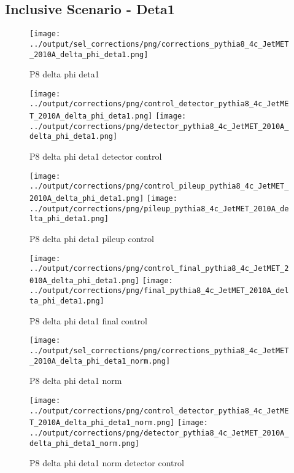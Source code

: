 \documentclass[11pt]{book}
\begin{document}
\clearpage
\subsection{Inclusive Scenario - Deta1}

\begin{figure}[ht]
\centering
\texttt{[image: ../output/sel\_corrections/png/corrections\_pythia8\_4c\_JetMET\_2010A\_delta\_phi\_deta1.png]}
\caption{P8 delta phi deta1}
\label{fig:p8_JetMET_2010A_delta_phi_deta1}
\end{figure}


\begin{figure}[ht]
\centering
\texttt{[image: ../output/corrections/png/control\_detector\_pythia8\_4c\_JetMET\_2010A\_delta\_phi\_deta1.png]}
\texttt{[image: ../output/corrections/png/detector\_pythia8\_4c\_JetMET\_2010A\_delta\_phi\_deta1.png]}
\caption{P8 delta phi deta1 detector control}
\label{fig:p8_JetMET_2010A_delta_phi_deta1_detector_control}
\end{figure}

\begin{figure}[ht]
\centering
\texttt{[image: ../output/corrections/png/control\_pileup\_pythia8\_4c\_JetMET\_2010A\_delta\_phi\_deta1.png]}
\texttt{[image: ../output/corrections/png/pileup\_pythia8\_4c\_JetMET\_2010A\_delta\_phi\_deta1.png]}
\caption{P8 delta phi deta1 pileup control}
\label{fig:p8_JetMET_2010A_delta_phi_deta1_pileup_control}
\end{figure}


\begin{figure}[ht]
\centering
\texttt{[image: ../output/corrections/png/control\_final\_pythia8\_4c\_JetMET\_2010A\_delta\_phi\_deta1.png]}
\texttt{[image: ../output/corrections/png/final\_pythia8\_4c\_JetMET\_2010A\_delta\_phi\_deta1.png]}
\caption{P8 delta phi deta1 final control}
\label{fig:p8_JetMET_2010A_delta_phi_deta1_final_control}
\end{figure}


\begin{figure}[ht]
\centering
\texttt{[image: ../output/sel\_corrections/png/corrections\_pythia8\_4c\_JetMET\_2010A\_delta\_phi\_deta1\_norm.png]}
\caption{P8 delta phi deta1 norm}
\label{fig:p8_JetMET_2010A_delta_phi_deta1_norm}
\end{figure}

\begin{figure}[ht]
\centering
\texttt{[image: ../output/corrections/png/control\_detector\_pythia8\_4c\_JetMET\_2010A\_delta\_phi\_deta1\_norm.png]}
\texttt{[image: ../output/corrections/png/detector\_pythia8\_4c\_JetMET\_2010A\_delta\_phi\_deta1\_norm.png]}
\caption{P8 delta phi deta1 norm detector control}
\label{fig:p8_JetMET_2010A_delta_phi_deta1_norm_detector_control}
\end{figure}
\end{document}
